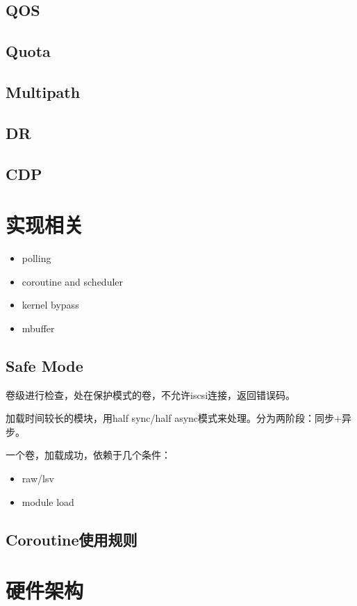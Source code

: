 \documentclass[UTF8]{ctexart}
\begin{document}
\subsection{QOS}
\subsection{Quota}
\subsection{Multipath}
\subsection{DR}
\subsection{CDP}

\section{实现相关}

\begin{itemize}
    \item polling
    \item coroutine and scheduler
    \item kernel bypass
    \item mbuffer
\end{itemize}

\subsection{Safe Mode}

卷级进行检查，处在保护模式的卷，不允许iscsi连接，返回错误码。

加载时间较长的模块，用half sync/half async模式来处理。分为两阶段：同步+异步。

一个卷，加载成功，依赖于几个条件：
\begin{itemize}
    \item raw/lsv
    \item module load
\end{itemize}

\subsection{Coroutine使用规则}


\section{硬件架构}
\end{document}

